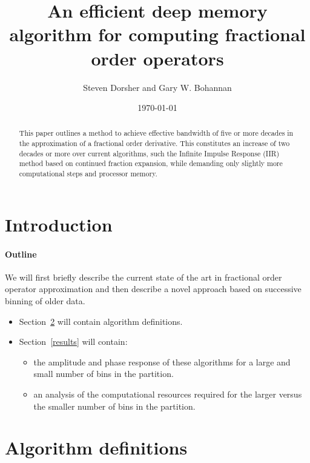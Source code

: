 \documentclass[12pt]{article}
\begin{document}
\title{An efficient deep memory algorithm for computing fractional order operators}
\author{
Steven Dorsher and Gary W. Bohannan
}
\date{\today}

\maketitle

\begin{abstract}
This paper outlines a method to achieve effective bandwidth of five or more decades in the approximation of a fractional order derivative. This constitutes an increase of two decades or more over current algorithms, such the Infinite Impulse Response (IIR) method based on continued fraction expansion, while demanding only slightly more computational steps and processor memory. 
\end{abstract}

\section{Introduction}


\paragraph{Outline\\}
We will first briefly describe the current state of the art in fractional order operator approximation and then describe a novel approach based on successive binning of older data.

\begin{itemize} 
\item Section~\ref{algorithmDefn} will contain algorithm definitions. 
\item Section~\ref{results} will contain:
	\begin{itemize}
	\item  the amplitude and phase response of these algorithms for a large and small number of bins in the partition. 
	\item  an analysis of the computational resources required for the larger versus the smaller number of bins in the partition.
	\end{itemize}
\end{itemize}


\section{Algorithm definitions}\label{algorithmDefn}
\end{document}
